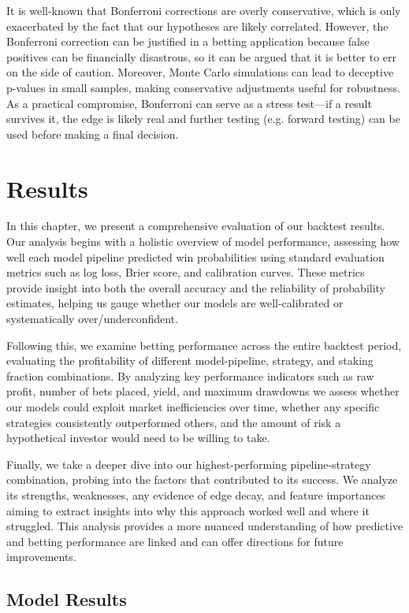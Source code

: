 \documentclass[12pt,twoside]{report}
\begin{document}
It is well-known that Bonferroni corrections are overly conservative, which is only exacerbated by the fact that our hypotheses are likely correlated. However, the Bonferroni correction can be justified in a betting application because false positives can be financially disastrous, so it can be argued that it is better to err on the side of caution. Moreover, Monte Carlo simulations can lead to deceptive p-values in small samples, making conservative adjustments useful for robustness. As a practical compromise, Bonferroni can serve as a stress test---if a result survives it, the edge is likely real and further testing (e.g. forward testing) can be used before making a final decision.


\chapter{Results}

In this chapter, we present a comprehensive evaluation of our backtest results. Our analysis begins with a holistic overview of model performance, assessing how well each model pipeline predicted win probabilities using standard evaluation metrics such as log loss, Brier score, and calibration curves. These metrics provide insight into both the overall accuracy and the reliability of probability estimates, helping us gauge whether our models are well-calibrated or systematically over/underconfident.

Following this, we examine betting performance across the entire backtest period, evaluating the profitability of different model-pipeline, strategy, and staking fraction combinations. By analyzing key performance indicators such as raw profit, number of bets placed, yield, and maximum drawdowns we assess whether our models could exploit market inefficiencies over time, whether any specific strategies consistently outperformed others, and the amount of risk a hypothetical investor would need to be willing to take.

Finally, we take a deeper dive into our highest-performing pipeline-strategy combination, probing into the factors that contributed to its success. We analyze its strengths, weaknesses, any evidence of edge decay, and feature importances aiming to extract insights into why this approach worked well and where it struggled. This analysis provides a more nuanced understanding of how predictive and betting performance are linked and can offer directions for future improvements.

\section{Model Results}
\end{document}

